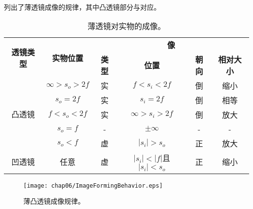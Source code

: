 列出了薄透镜成像的规律，其中凸透镜部分与对应。
\begin{table}[htbp]
    \centering
    \begin{tabular}{c|c|cccc}
        \toprule
        \multirow{2}{*}{\textbf{透镜类型}} & \multirow{2}{*}{\textbf{实物位置}} & \multicolumn{4}{c}{\textbf{像}}                                                                \\
        \cline{3-6}
                                           &                                    & \textbf{类型}                   & \textbf{位置}            & \textbf{朝向} & \textbf{相对大小} \\
        \midrule
        \multirow{5}{*}{凸透镜}            & $\infty>s_o>2f$                    & 实                              & $f<s_i<2f$               & 倒            & 缩小              \\
                                           & $s_o=2f$                           & 实                              & $s_i=2f$                 & 倒            & 相等              \\
                                           & $f<s_o<2f$                         & 实                              & $\infty>s_i>2f$          & 倒            & 放大              \\
                                           & $s_o=f$                            & -                               & $\pm\infty$              & -             & -                 \\
                                           & $s_o<f$                            & 虚                              & $|s_i|>s_o$              & 正            & 放大              \\
        \midrule
        凹透镜                             & 任意                               & 虚                              & $|s_i|<|f|$且$|s_i|<s_o$ & 正            & 缩小              \\
        \bottomrule
    \end{tabular}
    \caption{薄透镜对实物的成像。}
    \label{tab:6.2}
\end{table}

\begin{figure}
    \centering\texttt{[image: chap06/ImageFormingBehavior.eps]}
    \caption{薄凸透镜成像规律。}
    \label{fig:6.40}
\end{figure}

